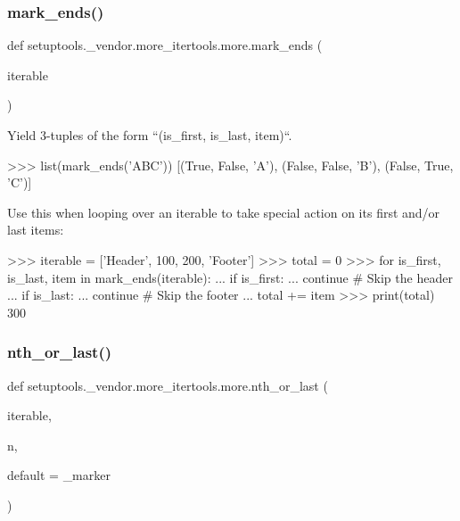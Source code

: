 \subsubsection{\texorpdfstring{mark\+\_\+ends()}{mark\_ends()}}
{\footnotesize\ttfamily def setuptools.\+\_\+vendor.\+more\+\_\+itertools.\+more.\+mark\+\_\+ends (\begin{DoxyParamCaption}\item[{}]{iterable }\end{DoxyParamCaption})}

\begin{DoxyVerb}Yield 3-tuples of the form ``(is_first, is_last, item)``.

>>> list(mark_ends('ABC'))
[(True, False, 'A'), (False, False, 'B'), (False, True, 'C')]

Use this when looping over an iterable to take special action on its first
and/or last items:

>>> iterable = ['Header', 100, 200, 'Footer']
>>> total = 0
>>> for is_first, is_last, item in mark_ends(iterable):
...     if is_first:
...         continue  # Skip the header
...     if is_last:
...         continue  # Skip the footer
...     total += item
>>> print(total)
300
\end{DoxyVerb}
 \mbox{\label{namespacesetuptools_1_1__vendor_1_1more__itertools_1_1more_a6d9ade86fac5ccaff3d9591dd143575a}} 
\subsubsection{\texorpdfstring{nth\+\_\+or\+\_\+last()}{nth\_or\_last()}}
{\footnotesize\ttfamily def setuptools.\+\_\+vendor.\+more\+\_\+itertools.\+more.\+nth\+\_\+or\+\_\+last (\begin{DoxyParamCaption}\item[{}]{iterable,  }\item[{}]{n,  }\item[{}]{default = {\ttfamily \+\_\+marker} }\end{DoxyParamCaption})}

